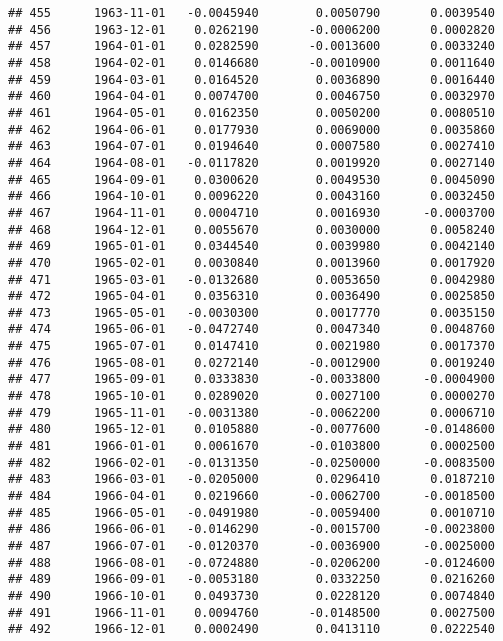 \documentclass[
]{article}
\begin{document}
\begin{verbatim}
## 455      1963-11-01   -0.0045940        0.0050790       0.0039540
## 456      1963-12-01    0.0262190       -0.0006200       0.0002820
## 457      1964-01-01    0.0282590       -0.0013600       0.0033240
## 458      1964-02-01    0.0146680       -0.0010900       0.0011640
## 459      1964-03-01    0.0164520        0.0036890       0.0016440
## 460      1964-04-01    0.0074700        0.0046750       0.0032970
## 461      1964-05-01    0.0162350        0.0050200       0.0080510
## 462      1964-06-01    0.0177930        0.0069000       0.0035860
## 463      1964-07-01    0.0194640        0.0007580       0.0027410
## 464      1964-08-01   -0.0117820        0.0019920       0.0027140
## 465      1964-09-01    0.0300620        0.0049530       0.0045090
## 466      1964-10-01    0.0096220        0.0043160       0.0032450
## 467      1964-11-01    0.0004710        0.0016930      -0.0003700
## 468      1964-12-01    0.0055670        0.0030000       0.0058240
## 469      1965-01-01    0.0344540        0.0039980       0.0042140
## 470      1965-02-01    0.0030840        0.0013960       0.0017920
## 471      1965-03-01   -0.0132680        0.0053650       0.0042980
## 472      1965-04-01    0.0356310        0.0036490       0.0025850
## 473      1965-05-01   -0.0030300        0.0017770       0.0035150
## 474      1965-06-01   -0.0472740        0.0047340       0.0048760
## 475      1965-07-01    0.0147410        0.0021980       0.0017370
## 476      1965-08-01    0.0272140       -0.0012900       0.0019240
## 477      1965-09-01    0.0333830       -0.0033800      -0.0004900
## 478      1965-10-01    0.0289020        0.0027100       0.0000270
## 479      1965-11-01   -0.0031380       -0.0062200       0.0006710
## 480      1965-12-01    0.0105880       -0.0077600      -0.0148600
## 481      1966-01-01    0.0061670       -0.0103800       0.0002500
## 482      1966-02-01   -0.0131350       -0.0250000      -0.0083500
## 483      1966-03-01   -0.0205000        0.0296410       0.0187210
## 484      1966-04-01    0.0219660       -0.0062700      -0.0018500
## 485      1966-05-01   -0.0491980       -0.0059400       0.0010710
## 486      1966-06-01   -0.0146290       -0.0015700      -0.0023800
## 487      1966-07-01   -0.0120370       -0.0036900      -0.0025000
## 488      1966-08-01   -0.0724880       -0.0206200      -0.0124600
## 489      1966-09-01   -0.0053180        0.0332250       0.0216260
## 490      1966-10-01    0.0493730        0.0228120       0.0074840
## 491      1966-11-01    0.0094760       -0.0148500       0.0027500
## 492      1966-12-01    0.0002490        0.0413110       0.0222540

\end{verbatim}
\end{document}
